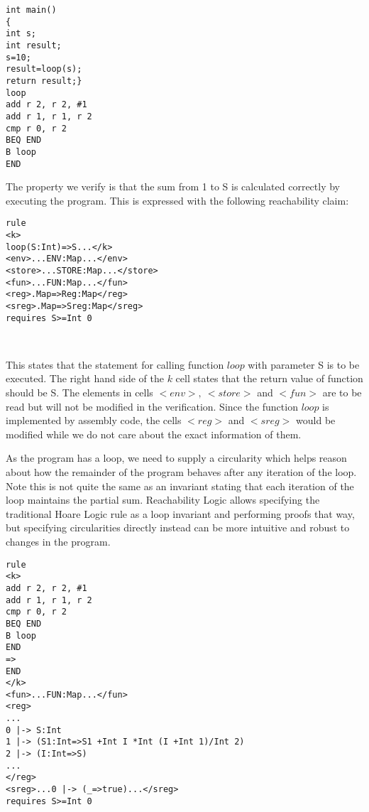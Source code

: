 \documentclass[letterpaper, 10 pt, conference]{IEEEtran}
\begin{document}
\vspace{11pt}
\begin{lstlisting}
int main()
{
int s;
int result;
s=10;
result=loop(s);
return result;}
loop
add r 2, r 2, #1
add r 1, r 1, r 2
cmp r 0, r 2
BEQ END
B loop
END
\end{lstlisting}
\vspace{11pt}

\par The property we verify is that the sum from 1 to S is calculated correctly by executing the program. This is expressed with the following reachability claim:

\vspace{11pt}
\lstset{style=k}
\begin{minipage}{0.7\textwidth}
\begin{BVerbatim}
rule
<k>
loop(S:Int)=>S...</k>
<env>...ENV:Map...</env>
<store>...STORE:Map...</store>
<fun>...FUN:Map...</fun>
<reg>.Map=>Reg:Map</reg>
<sreg>.Map=>Sreg:Map</sreg>
requires S>=Int 0
\end{BVerbatim}
\end{minipage}\\
\vspace{11pt}

\par This states that the statement for calling function $loop$ with parameter S is to be executed. The right hand side of the $k$ cell states that the return value of function should be S. The elements in cells $<env>,~<store>$ and $<fun>$ are to be read but will not be modified in the verification. Since the function $loop$ is implemented by assembly code, the cells $<reg>$ and $<sreg>$ would be modified while we do not care about the exact information of them.
\par As the program has a loop, we need to supply a circularity which helps
reason about how the remainder of the program behaves after any iteration of the loop. Note this is not quite
the same as an invariant stating that each iteration of the loop maintains the partial sum. Reachability Logic allows specifying the traditional Hoare Logic rule as a loop invariant and performing proofs that way, but specifying circularities directly instead can be more intuitive and robust to changes in the program.\\
\vspace{11pt}

\lstset{style=k}
\begin{minipage}{0.35\textwidth}
\begin{BVerbatim}
rule
<k>
add r 2, r 2, #1
add r 1, r 1, r 2
cmp r 0, r 2
BEQ END
B loop
END
=>
END
</k>
<fun>...FUN:Map...</fun>
<reg>
...
0 |-> S:Int
1 |-> (S1:Int=>S1 +Int I *Int (I +Int 1)/Int 2)
2 |-> (I:Int=>S)
...
</reg>
<sreg>...0 |-> (_=>true)...</sreg>
requires S>=Int 0
\end{BVerbatim}
\end{minipage}\\
\vspace{11pt}
\end{document}
